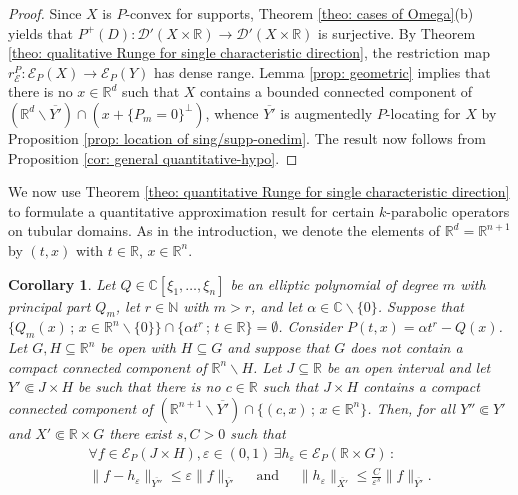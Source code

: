 \documentclass[12pt]{amsart}
\newcommand{\N}{\mathbb{N}}
\newcommand{\R}{\mathbb{R}}
\newcommand{\C}{\mathbb{C}}
\newtheorem{corollary}[theorem]{Corollary}
\theoremstyle{definition}
\theoremstyle{remark}
\numberwithin{equation}{section}
\begin{document}
\begin{proof}
		Since $X$ is $P$-convex for supports,  Theorem \ref{theo: cases of Omega}(b) yields that $P^+(D): \mathscr{D}'(X\times\R) \to \mathscr{D}'(X\times\R)$ is surjective. By Theorem \ref{theo: qualitative Runge for single characteristic direction}, the restriction map $r_\mathscr{E}^P:\mathscr{E}_P(X)\rightarrow\mathscr{E}_P(Y)$ has dense range.  Lemma \ref{prop: geometric} implies  that there is no $x\in\R^d$ such that $X$ contains a bounded connected component of $\left(\R^d\backslash\overline{Y'}\right)\cap\left(x+ \{P_m=0\}
		^\perp\right)$, whence $\overline{Y'}$ is augmentedly $P$-locating for $X$ by Proposition \ref{prop: location of sing/supp-onedim}.  The result now  follows from Proposition \ref{cor: general quantitative-hypo}.	
\end{proof}

We now use  Theorem \ref{theo: quantitative Runge for single characteristic direction} to formulate a quantitative approximation result for certain $k$-parabolic  operators  on tubular domains. As in the introduction, we denote the elements of $ \R^d = \R^{n+1}$ by $(t,x)$ with $t\in\R$, $x\in\R^n$.

\begin{corollary}\label{cor: quantitative Runge for parabolic}
	 Let $Q\in\C[\xi_1,\ldots,\xi_n]$ be an elliptic polynomial of degree $m$ with principal part $Q_m$, let $r\in\N$ with $m>r$, and let $\alpha\in\C\backslash\{0\}$. Suppose that $\{ Q_m(x) \, ; \, x \in \R^n\backslash\{0\} \} \cap \{\alpha t^r \,;\,t\in\R\} = \emptyset$. Consider $P(t,x)=\alpha t^r-Q(x)$.
	Let $G,H\subseteq\R^n$ be open with $H\subseteq G$ and suppose that $G$ does not contain a compact connected component of $\R^n\backslash H$. Let $J\subseteq\R$ be an open interval and let $Y'\Subset J\times H$ be such that there is no $c\in\R$ such that $J \times H$ contains a compact connected component of  $\left(\R^{n+1}\backslash\overline{Y'}\right) \cap\{(c, x) \, ; \,  x \in\R^{n}\}$. Then, for all $Y'' \Subset Y'$ and $X' \Subset \R\times G$  there exist $s, C>0$ such that
	\begin{gather*}
		\forall f\in\mathscr{E}_P(J \times H), \varepsilon\in (0,1) \,\exists h_\varepsilon \in\mathscr{E}_P(\R \times G) \, :\\
		\|f-h_\varepsilon\|_{\overline{Y''}}\leq \varepsilon\|f\|_{\overline{Y'}} \quad \mbox{ and } \quad \|h_\varepsilon\|_{\overline{X'}}\leq\frac{C}{\varepsilon^s}\|f\|_{\overline{Y'}}.
	\end{gather*}
\end{corollary}
\end{document}

